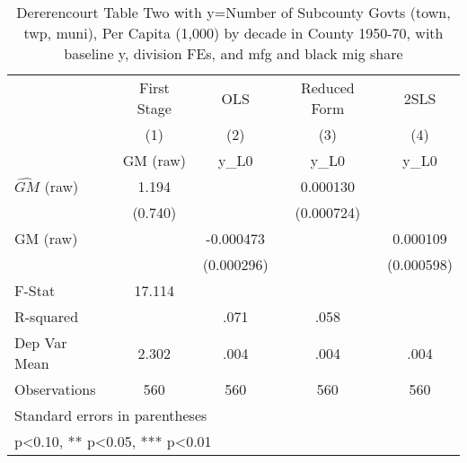 \begin{table}[htbp]\centering
\def\sym#1{\ifmmode^{#1}\else\(^{#1}\)\fi}
\caption{Dererencourt Table Two with y=Number of Subcounty Govts (town, twp, muni), Per Capita (1,000) by decade in County 1950-70, with baseline y, division FEs, and mfg and black mig share}
\begin{tabular}{l*{4}{c}}
\toprule
                    & First Stage   &         OLS   &Reduced Form   &        2SLS   \\
                    &\multicolumn{1}{c}{(1)}&\multicolumn{1}{c}{(2)}&\multicolumn{1}{c}{(3)}&\multicolumn{1}{c}{(4)}\\
                    &\multicolumn{1}{c}{GM  (raw)}&\multicolumn{1}{c}{y\_L0}&\multicolumn{1}{c}{y\_L0}&\multicolumn{1}{c}{y\_L0}\\
\midrule
$\hat{GM}$ (raw)    &       1.194   &               &    0.000130   &               \\
                    &     (0.740)   &               &  (0.000724)   &               \\
\addlinespace
GM  (raw)           &               &   -0.000473   &               &    0.000109   \\
                    &               &  (0.000296)   &               &  (0.000598)   \\
\midrule
F-Stat              &      17.114   &               &               &               \\
R-squared           &               &        .071   &        .058   &               \\
Dep Var Mean        &       2.302   &        .004   &        .004   &        .004   \\
Observations        &         560   &         560   &         560   &         560   \\
\bottomrule
\multicolumn{5}{l}{\footnotesize Standard errors in parentheses}\\
\multicolumn{5}{l}{\footnotesize * p<0.10, ** p<0.05, *** p<0.01}\\
\end{tabular}
\end{table}
